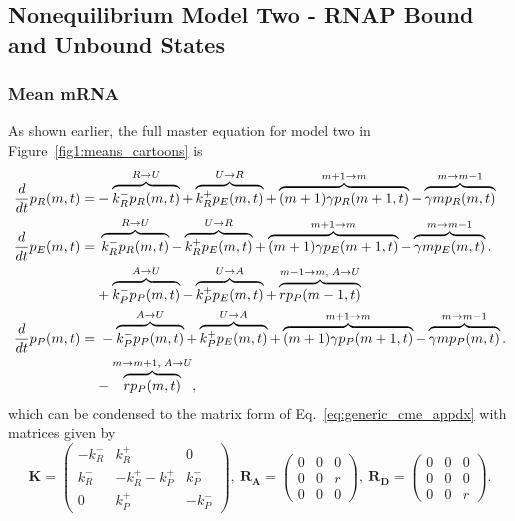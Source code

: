 \subsection{Nonequilibrium Model Two - RNAP Bound and Unbound States}
\subsubsection{Mean mRNA}
As shown earlier, the full master equation for model two in
Figure~\ref{fig1:means_cartoons} is
\begin{align}
\begin{split}
\frac{d {}}{d t}p_R(m,t) =& 
- \overbrace{k_R^- p_R(m,t)}^{R \rightarrow U}
+ \overbrace{k_R^+ p_E(m,t)}^{U \rightarrow R}
+ \overbrace{(m+1)\gamma p_R(m+1,t)}^{m + 1 \rightarrow m}
- \overbrace{\gamma mp_R(m,t)}^{m \rightarrow m - 1}
\\
\frac{d {}}{d t}p_E(m,t) =&\; 
    \overbrace{k_R^- p_R(m,t)}^{R \rightarrow U}
- \overbrace{k_R^+ p_E(m,t)}^{U \rightarrow R}
+ \overbrace{(m+1)\gamma p_E(m+1,t)}^{m + 1 \rightarrow m}
- \overbrace{\gamma mp_E(m,t)}^{m \rightarrow m - 1}.
\\
&
+ \overbrace{k_P^- p_P(m,t)}^{A \rightarrow U}
- \overbrace{k_P^+ p_E(m,t)}^{U \rightarrow A}
+ \overbrace{rp_P(m-1,t)}^{m-1 \rightarrow m,\;A \rightarrow U}
\\
\frac{d {}}{d t}p_P(m,t) =&\; 
- \overbrace{k_P^- p_P(m,t)}^{A \rightarrow U}
+ \overbrace{k_P^+ p_E(m,t)}^{U \rightarrow A}
+ \overbrace{(m+1)\gamma p_P(m+1,t)}^{m + 1 \rightarrow m}
- \overbrace{\gamma mp_P(m,t)}^{m \rightarrow m - 1}.
\\
&- \overbrace{rp_P(m,t)}^{m \rightarrow m + 1,\;A \rightarrow U},
\end{split}
\end{align}
which can be condensed to the matrix form of Eq.~\ref{eq:generic_cme_appdx} with
matrices given by
\begin{equation}
\mathbf{K} = \begin{pmatrix} -k_R^- & k_R^+ & 0 \\
                        k_R^- & -k_R^+ -k_P^+ & k_P^- \\
                        0 & k_P^+ & -k_P^- 
                \end{pmatrix},\
\mathbf{R_A} = \begin{pmatrix}
                0 & 0 & 0 \\ 
                0 & 0 & r \\ 
                0 & 0 & 0
                \end{pmatrix},\
\mathbf{R_D} = \begin{pmatrix}
                0 & 0 & 0 \\ 
                0 & 0 & 0 \\ 
                0 & 0 & r
                \end{pmatrix}.
\label{eq:model2_matrices_appdx}
\end{equation}
